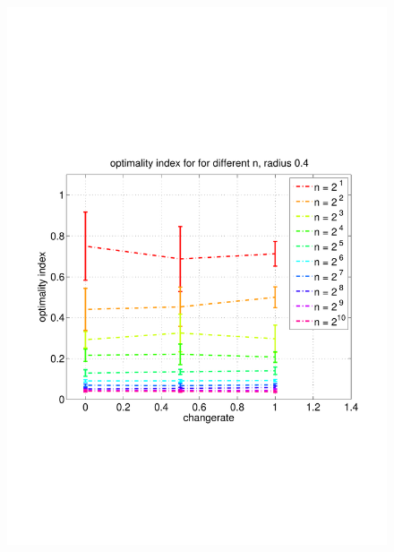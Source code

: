 \documentclass[11pt]{article}
\begin{document}
\begin{figure}
	\includegraphics[width=\linewidth]{../../code/data/2014_12_12_00_55_41/figure_10}
\end{figure}
\end{document}

